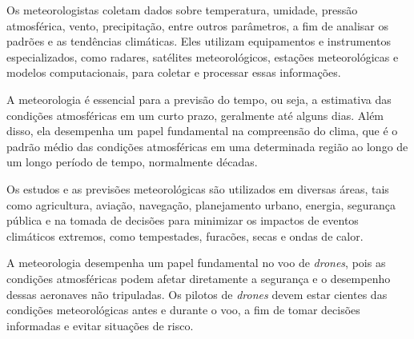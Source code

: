 \documentclass[a4paper, 12pt, onecolumn,singlespacing]{article}
\begin{document}
	Os meteorologistas coletam dados sobre temperatura, umidade, pressão atmosférica, vento, precipitação, entre outros parâmetros, a fim de analisar os padrões e as tendências climáticas. Eles utilizam equipamentos e instrumentos especializados, como radares, satélites meteorológicos, estações meteorológicas e modelos computacionais, para coletar e processar essas informações.
	
	A meteorologia é essencial para a previsão do tempo, ou seja, a estimativa das condições atmosféricas em um curto prazo, geralmente até alguns dias. Além disso, ela desempenha um papel fundamental na compreensão do clima, que é o padrão médio das condições atmosféricas em uma determinada região ao longo de um longo período de tempo, normalmente décadas.
	
	Os estudos e as previsões meteorológicas são utilizados em diversas áreas, tais como agricultura, aviação, navegação, planejamento urbano, energia, segurança pública e na tomada de decisões para minimizar os impactos de eventos climáticos extremos, como tempestades, furacões, secas e ondas de calor.
	
	A meteorologia desempenha um papel fundamental no voo de \textit{drones}, pois as condições atmosféricas podem afetar diretamente a segurança e o desempenho dessas aeronaves não tripuladas. Os pilotos de \textit{drones} devem estar cientes das condições meteorológicas antes e durante o voo, a fim de tomar decisões informadas e evitar situações de risco.
	
\end{document}
